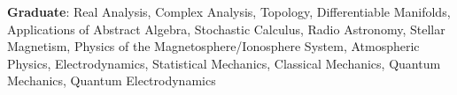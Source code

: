 \noindent\textbf{Graduate}:
    Real Analysis, Complex Analysis, Topology, Differentiable Manifolds,
    Applications of Abstract Algebra, Stochastic Calculus, 
    Radio Astronomy, Stellar Magnetism, Physics of the Magnetosphere/Ionosphere System,
    Atmospheric Physics, Electrodynamics, Statistical Mechanics,
    Classical Mechanics, Quantum Mechanics, Quantum Electrodynamics
